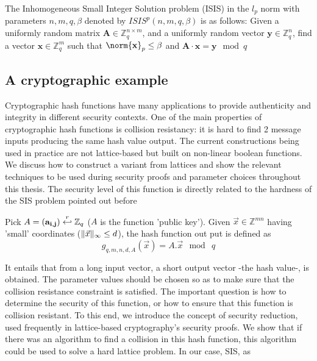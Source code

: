 \begin{definition}
  The Inhomogeneous Small Integer Solution problem (ISIS) in the $l_{p}$ norm with parameters $n, m, q, \beta$ denoted by $ISIS^{p}(n, m, q, \beta)$ is as follows: Given a uniformly random matrix $\mathbf{A} \in \mathbb{Z}^{n \times m}_{q}$, and a uniformly random vector $\mathbf{y} \in \mathbb{Z}_{q}^{n}$, find a vector $\mathbf{x} \in \mathbb{Z}_{q}^{m}$ such that $\norm{\mathbf{x}}_{p} \leq \beta$ and $\mathbf{A} \cdot \mathbf{x} = \mathbf{y} \mod q$
\end{definition}

\subsection{A cryptographic example}
\label{sec:ajtaiHash}
Cryptographic hash functions have many applications to
provide authenticity and integrity in different security contexts. One of the main properties of cryptographic
hash functions is collision resistancy: it is hard to find 2 message inputs
producing the same hash value output. The current constructions being used in practice
are not lattice-based but built on non-linear boolean functions. We discuss how
to construct a variant from lattices and show the relevant techniques
to be used during security proofs and parameter choices throughout this
thesis. The security level of this function is directly related to the hardness of
the SIS problem pointed out before
\begin{definition}
  Pick $A=(\mathbf{a_{i,j}}) \stackrel{r}{\hookleftarrow} \mathbb{Z}_q$ ($A$ is the function
  'public key'). Given $\vec{x} \in \mathbb{Z}^{mn}$ having 'small' coordinates
  ($\Vert \vec{x} \Vert_{\infty} \leq d$), the hash function out put is defined as
  \[
    g_{q,m,n,d,A}(\vec{x}) = A . \vec{x} \mod \ q
  \]
  \label{def:Ajtai's Hash Function}
\end{definition}
It entails that from a long input vector, a short output vector -the hash value-, is obtained. The parameter values should be chosen so as to make sure that the collision resistance constraint is
satisfied. The important question is how to determine the security of this
function, or how to ensure that this function is collision resistant. To this end, we
introduce the concept of security reduction, used frequently in
lattice-based cryptography's security proofs. We show that if there
was an algorithm to find a collision in this hash function, this algorithm could be used
to solve a hard lattice problem. In our case, SIS, as
